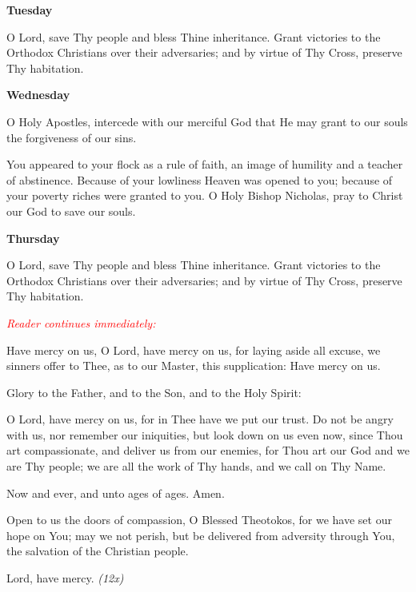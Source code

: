 \begin{center}
\textbf{Tuesday}
\end{center}

\begin{hang}
\noindent\makebox[\indt][l]{}O Lord, save Thy people and bless Thine 
inheritance.  Grant victories to the Orthodox Christians over their 
adversaries; and by virtue of Thy Cross, preserve Thy habitation.

\end{hang}


\begin{center}
\textbf{Wednesday}
\end{center}

\begin{hang}
\noindent\makebox[\indt][l]{}O Holy Apostles, intercede with our merciful God 
that He may grant to our souls the forgiveness of our sins.

You appeared to your flock as a rule of faith, an image of humility and a 
teacher of abstinence.  Because of your lowliness Heaven was opened to you; 
because of your poverty riches were granted to you.  O Holy Bishop Nicholas, 
pray to Christ our God to save our souls.

\end{hang}

\begin{center}
\textbf{Thursday}
\end{center}

\begin{hang}
\noindent\makebox[\indt][l]{}O Lord, save Thy people and bless Thine 
inheritance.  Grant victories to the Orthodox Christians over their 
adversaries; and by virtue of Thy Cross, preserve Thy habitation.

\end{hang}

\noindent
\textcolor{red}{\textit{Reader continues immediately:}}

\begin{hang}
\noindent\makebox[\indt][l]{}Have mercy on us, O Lord, have mercy on us, for 
laying aside all excuse, we sinners offer to Thee, as to our Master, this 
supplication: Have mercy on us.

Glory to the Father, and to the Son, and to the Holy Spirit:

O Lord, have mercy on us, for in Thee have we put our trust. Do not be angry 
with us, nor remember our iniquities, but look down on us even now, since Thou 
art compassionate, and deliver us from our enemies, for Thou art our God and we 
are Thy people; we are all the work of Thy hands, and we call on Thy Name.

Now and ever, and unto ages of ages.  Amen.

Open to us the doors of compassion, O Blessed Theotokos, for we have set our 
hope on You; may we not perish, but be delivered from adversity through You, 
the salvation of the Christian people.

Lord, have mercy. \textit{(12x)}

\end{hang}

